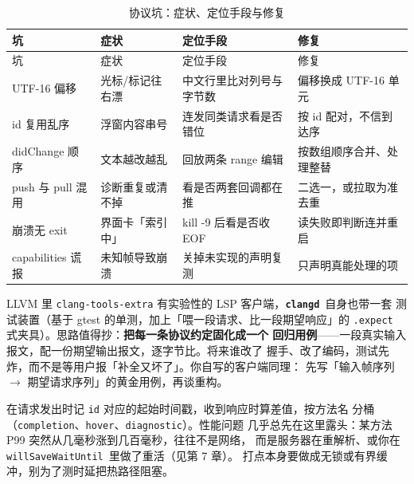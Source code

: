 \documentclass[12pt,a4paper,fontset=fandol]{ctexbook}
\newcommand{\Bk}{\discretionary{}{}{}}
\newcommand{\Lib}[1]{\textbf{\texttt{#1}}}
\newcommand{\CD}{\Lib{clangd}}
\begin{document}
{\small\setlength{\tabcolsep}{3pt}
\begin{longtable}{>{\raggedright\arraybackslash}p{} >{\raggedright\arraybackslash}p{} >{\raggedright\arraybackslash}p{} >{\raggedright\arraybackslash}p{}}
\caption{协议坑：症状、定位手段与修复}\label{tab:ch08-pitfall}\\
\toprule
坑 & 症状 & 定位手段 & 修复 \\
\midrule
\endfirsthead
\toprule
坑 & 症状 & 定位手段 & 修复 \\
\midrule
\endhead
\bottomrule
\endfoot
UTF-16 偏移 & 光标/标记往右漂 & 中文行里比对列号与字节数 & 偏移换成 UTF-16 单元 \\
id 复用乱序 & 浮窗内容串号 & 连发同类请求看是否错位 & 按 id 配对，不信到达序 \\
didChange 顺序 & 文本越改越乱 & 回放两条 range 编辑 & 按数组顺序合并、处理整替 \\
push 与 pull 混用 & 诊断重复或清不掉 & 看是否两套回调都在推 & 二选一，或拉取为准去重 \\
崩溃无 exit & 界面卡「索引中」 & kill -9 后看是否收 EOF & 读失败即判断连并重启 \\
capabilities 谎报 & 未知帧导致崩溃 & 关掉未实现的声明复测 & 只声明真能处理的项 \\
\end{longtable}}

\begin{note}[title={用回归测试把协议行为钉死}]
LLVM 里 \texttt{clang-tools-extra} 有实验性的 LSP 客户端，\CD\ 自身也带一套
测试装置（基于 gtest 的单测，加上「喂一段请求、比一段期望响应」的
\texttt{.expect} 式夹具）。思路值得抄：\textbf{把每一条协议约定固化成一个
回归用例}——一段真实输入报文，配一份期望输出报文，逐字节比。将来谁改了
握手、改了编码，测试先炸，而不是等用户报「补全又坏了」。你自写的客户端同理：
先写「输入帧序列 \(\to\) 期望请求序列」的黄金用例，再谈重构。
\end{note}

\begin{bestpractice}[title={给每个请求打点往返时间}]
在请求发出时记 \texttt{id} 对应的起始时间戳，收到响应时算差值，按方法名
分桶（\texttt{completion}、\texttt{hover}、\texttt{diagnostic}）。性能问题
几乎总先在这里露头：某方法 P99 突然从几毫秒涨到几百毫秒，往往不是网络，
而是服务器在重解析、或你在 \texttt{willSaveWaitUntil}\Bk\ 里做了重活（见第 7 章）。
打点本身要做成无锁或有界缓冲，别为了测时延把热路径阻塞。
\end{bestpractice}
\end{document}
